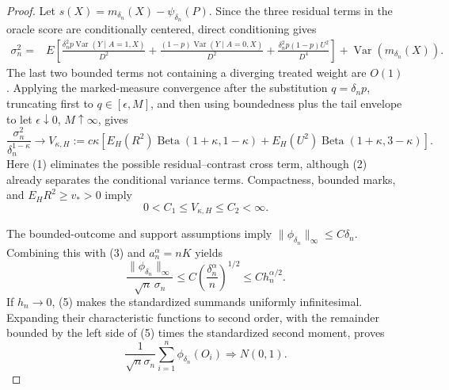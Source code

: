\documentclass{article}
\begin{document}
\begin{proof}
Let \(s(X)=m_{\delta_n}(X)-\psi_{\delta_n}(P)\).  Since the three residual terms in the oracle score are conditionally centered, direct conditioning gives
\[
\begin{split}
 \sigma_n^2={}&E\!\left[
 \frac{\delta_n^2p\operatorname{Var}(Y\mid A=1,X)}{D^2}
 +\frac{(1-p)\operatorname{Var}(Y\mid A=0,X)}{D^2}
 +\frac{\delta_n^2p(1-p)U^2}{D^4}
 \right]+\operatorname{Var}(m_{\delta_n}(X)).
\end{split} \tag{2}
\]
The last two bounded terms not containing a diverging treated weight are \(O(1)\).  Applying the marked-measure convergence after the substitution \(q=\delta_np\), truncating first to \(q\in[\epsilon,M]\), and then using boundedness plus the tail envelope to let \(\epsilon\downarrow0\), \(M\uparrow\infty\), gives
\[
 \frac{\sigma_n^2}{\delta_n^{1-\kappa}}
 \longrightarrow V_{\kappa,H}:=c\kappa\!\left[
 E_H(R^2)\operatorname{Beta}(1+\kappa,1-\kappa)
 +E_H(U^2)\operatorname{Beta}(1+\kappa,3-\kappa)
 \right]. \tag{3}
\]
Here (1) eliminates the possible residual--contrast cross term, although (2) already separates the conditional variance terms.  Compactness, bounded marks, and \(E_HR^2\geq v_*>0\) imply
\[
 0<C_1\leq V_{\kappa,H}\leq C_2<\infty. \tag{4}
\]

The bounded-outcome and support assumptions imply \(\|\phi_{\delta_n}\|_\infty\leq C\delta_n\).  Combining this with (3) and \(a_n^\alpha=nK\) yields
\[
 \frac{\|\phi_{\delta_n}\|_\infty}{\sqrt n\,\sigma_n}
 \leq C\left(\frac{\delta_n^\alpha}{n}\right)^{1/2}
 \leq C h_n^{\alpha/2}. \tag{5}
\]
If \(h_n\to0\), (5) makes the standardized summands uniformly infinitesimal.  Expanding their characteristic functions to second order, with the remainder bounded by the left side of (5) times the standardized second moment, proves
\[
 \frac{1}{\sqrt n\sigma_n}\sum_{i=1}^n\phi_{\delta_n}(O_i)\Rightarrow N(0,1). \tag{6}
\]


\end{proof}
\end{document}
